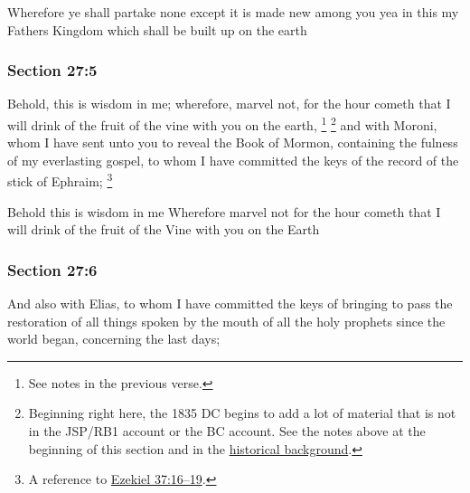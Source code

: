 		\begin{framed}
		\scriptsize
			\begin{compactdesc}
				\item[JSP] Wherefore ye shall partake none except it is made new among you yea in this my Fathers Kingdom which shall be built up on the earth
			\end{compactdesc}
		\end{framed}

	\subsubsection{Section 27:5} %
		\label{DC27-5}

		Behold, this is wisdom in me; wherefore, marvel not, for the hour cometh that I will drink of the fruit of the vine with you on the earth,%
			\footnote{%
				See notes in the previous verse.
				}
			\footnote{%
				Beginning right here, the 1835 DC begins to add a lot of material that is not in the JSP/RB1 account or the BC account. See the notes above at the beginning of this section and in the \hyperref[DC27-HB]{historical background}.
				}%
		and with Moroni, whom I have sent unto you to reveal the Book of Mormon, containing the fulness of my everlasting gospel, to whom I have committed the keys of the record of the stick of Ephraim;%
			\footnote{%
				A reference to \hyperref[EZEKIEL-37-16]{Ezekiel 37:16--19}.
				}

		\begin{framed}
		\scriptsize
			\begin{compactdesc}
				\item[JSP] Behold this is wisdom in me Wherefore marvel not for the hour cometh that I will drink of the fruit of the Vine with you on the Earth
			\end{compactdesc}
		\end{framed}

	\subsubsection{Section 27:6} %
		\label{DC27-6}

		And also with Elias, to whom I have committed the keys of bringing to pass the restoration of all things spoken by the mouth of all the holy prophets since the world began, concerning the last days;

